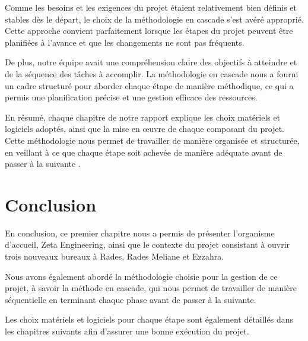 Comme les besoins et les exigences du projet étaient relativement bien définis et stables dès le départ, le choix de la méthodologie en cascade s'est avéré approprié. Cette approche convient parfaitement lorsque les étapes du projet peuvent être planifiées à l'avance et que les changements ne sont pas fréquents.


De plus, notre équipe avait une compréhension claire des objectifs à atteindre et de la séquence des tâches à accomplir. La méthodologie en cascade nous a fourni un cadre structuré pour aborder chaque étape de manière méthodique, ce qui a permis une planification précise et une gestion efficace des ressources.



En résumé, chaque chapitre de notre rapport explique les choix matériels et logiciels adoptés, ainsi que la mise en œuvre de chaque composant du projet. Cette méthodologie nous permet de travailler de manière organisée et structurée, en veillant à ce que chaque étape soit achevée de manière adéquate avant de passer à la suivante \cite{fagarasan2021agile}.





\section{Conclusion }
En conclusion, ce premier chapitre nous a permis de présenter l'organisme d'accueil, Zeta Engineering, ainsi que le contexte du projet consistant à ouvrir trois nouveaux bureaux à Rades, Rades Meliane et Ezzahra.

Nous avons également abordé la méthodologie choisie pour la gestion de ce projet, à savoir la méthode en cascade, qui nous permet de travailler de manière séquentielle en terminant chaque phase avant de passer à la suivante. 

Les choix matériels et logiciels pour chaque étape sont également détaillés dans les chapitres suivants afin d'assurer une bonne exécution du projet.